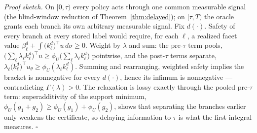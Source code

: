 \documentclass[10pt,twocolumn]{article}
\theoremstyle{definition}
\begin{document}
\emph{Proof sketch.} On \([0, \tau)\) every policy acts through one common
measurable signal (the blind-window reduction of Theorem~\ref{thm:delayed});
on \([\tau, T)\) the oracle grants each branch its own arbitrary measurable
signal. Fix \(d(\cdot)\). Safety of every branch at every stored label
would require, for each \(\ell\), a realized facet value
\(\beta_\ell^d + \int \big(k_\ell^d\big)^{\top} u\, d\sigma \ge 0\).
Weight by \(\lambda\) and sum: the pre-\(\tau\) term pools,
\(\big(\sum_\ell \lambda_\ell k_\ell^d\big)^{\top} u \ge
\phi_U\big(\sum_\ell \lambda_\ell k_\ell^d\big)\) pointwise, and the
post-\(\tau\) terms separate,
\(\lambda_\ell \big(k_\ell^d\big)^{\top} u_\theta \ge
\phi_U(\lambda_\ell k_\ell^d)\). Summing and rearranging, weighted
safety implies the bracket is nonnegative for every \(d(\cdot)\), hence its
infimum is nonnegative --- contradicting \(\Gamma(\lambda) > 0\). The
relaxation is lossy exactly through the pooled pre-\(\tau\) term:
superadditivity of the support minimum,
\(\phi_U(g_1 + g_2) \ge \phi_U(g_1) + \phi_U(g_2)\), shows that
separating the branches earlier only weakens the certificate, so delaying
information to \(\tau\) is what the first integral measures.
\hfill\(\square\)
\end{document}
